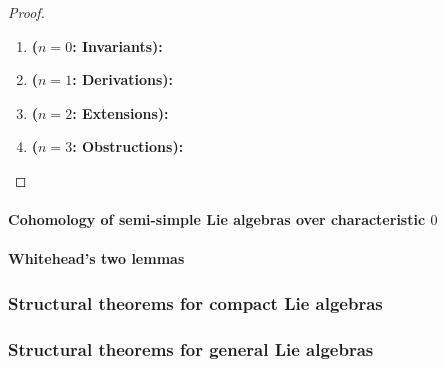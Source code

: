                         \begin{proof}
                            \noindent
                            \begin{enumerate}
                                \item \textbf{($n = 0$: Invariants):}
                                \item \textbf{($n = 1$: Derivations):}
                                \item \textbf{($n = 2$: Extensions):}
                                \item \textbf{($n = 3$: Obstructions):}
                            \end{enumerate}
                        \end{proof}
                
                \paragraph{Cohomology of semi-simple Lie algebras over characteristic \texorpdfstring{$0$}{}}
                
                \paragraph{Whitehead's two lemmas}
                    
            \subsubsection{Structural theorems for compact Lie algebras}
            
            \subsubsection{Structural theorems for general Lie algebras}
    
